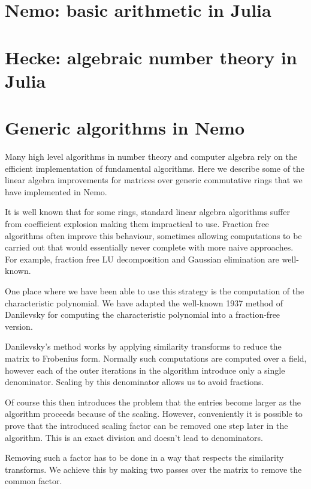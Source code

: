 \documentclass{sig-alternate-05-2015}
\begin{document}
\section{Nemo: basic arithmetic in Julia}

\section{Hecke: algebraic number theory in Julia}

\section{Generic algorithms in Nemo}

Many high level algorithms in number theory and computer algebra rely on
the efficient implementation of fundamental algorithms. Here we describe
some of the linear algebra improvements for matrices over generic commutative
rings that we have implemented in Nemo.

It is well known that for some rings, standard linear algebra algorithms
suffer from coefficient explosion making them impractical to use. Fraction
free algorithms often improve this behaviour, sometimes allowing computations
to be carried out that would essentially never complete with more naive
approaches. For example, fraction free LU decomposition and Gaussian
elimination are well-known.

One place where we have been able to use this strategy is the computation
of the characteristic polynomial. We have adapted the well-known 1937 method
of Danilevsky for computing the characteristic polynomial into a fraction-free
version.

Danilevsky's method works by applying similarity transforms to reduce the
matrix to Frobenius form. Normally such computations are computed over a
field, however each of the outer iterations in the algorithm introduce only
a single denominator. Scaling by this denominator allows us to avoid
fractions.

Of course this then introduces the problem that the entries become larger
as the algorithm proceeds because of the scaling. However, conveniently
it is possible to prove that the introduced scaling factor can be removed 
one step later in the algorithm. This is an exact division and doesn't
lead to denominators.

Removing such a factor has to be done in a way that respects the
similarity transforms. We achieve this by making two passes over the matrix
to remove the common factor.
\end{document}
